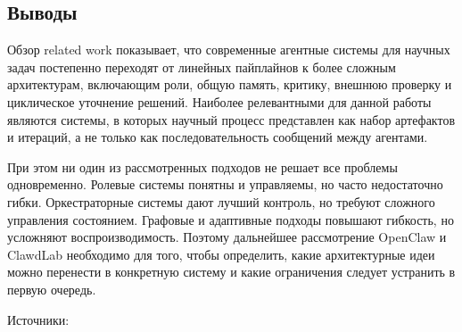 \subsection{Выводы}

Обзор related work показывает, что современные агентные системы для научных задач постепенно переходят от линейных пайплайнов к более сложным архитектурам, включающим роли, общую память, критику, внешнюю проверку и циклическое уточнение решений. Наиболее релевантными для данной работы являются системы, в которых научный процесс представлен как набор артефактов и итераций, а не только как последовательность сообщений между агентами.

При этом ни один из рассмотренных подходов не решает все проблемы одновременно. Ролевые системы понятны и управляемы, но часто недостаточно гибки. Оркестраторные системы дают лучший контроль, но требуют сложного управления состоянием. Графовые и адаптивные подходы повышают гибкость, но усложняют воспроизводимость. Поэтому дальнейшее рассмотрение OpenClaw и ClawdLab необходимо для того, чтобы определить, какие архитектурные идеи можно перенести в конкретную систему и какие ограничения следует устранить в первую очередь.

Источники:

